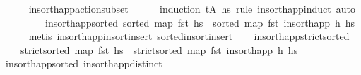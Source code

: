 \begin{isabellebody}
%
\isadelimproof
\ \ \ \ %
\endisadelimproof
%
\isatagproof
{}\isamarkupfalse%
\ insort{\isacharunderscore}{\kern0pt}happ{\isacharunderscore}{\kern0pt}action{\isacharunderscore}{\kern0pt}subset\isanewline
\ \ \ \ \isamarkupfalse%
\ {\isacharparenleft}{\kern0pt}induction\ {\isachardoublequoteopen}{\isacharparenleft}{\kern0pt}tA\ hs\ rule{\isacharcolon}{\kern0pt}\ insort{\isacharunderscore}{\kern0pt}happ{\isachardot}{\kern0pt}induct{\isacharparenright}{\kern0pt}\ auto%
\endisatagproof
{\isafoldproof}%
%
\isadelimproof
\isanewline
%
\endisadelimproof
\ \ \isanewline
\isanewline
\ \ \isanewline
\isanewline
\ \ \isamarkupfalse%
\ insort{\isacharunderscore}{\kern0pt}happ{\isacharunderscore}{\kern0pt}sorted{\isacharcolon}{\kern0pt}\ {\isachardoublequoteopen}sorted\ {\isacharparenleft}{\kern0pt}map\ fst\ hs{\isacharparenright}{\kern0pt}\ {\isasymLongrightarrow}\ sorted\ {\isacharparenleft}{\kern0pt}map\ fst\ {\isacharparenleft}{\kern0pt}insort{\isacharunderscore}{\kern0pt}happ\ h\ hs{\isacharparenright}{\kern0pt}{\isacharparenright}{\kern0pt}{\isachardoublequoteclose}\isanewline
%
\isadelimproof
\ \ \ \ %
\endisadelimproof
%
\isatagproof
{}\isamarkupfalse%
\ {\isacharparenleft}{\kern0pt}metis\ insort{\isacharunderscore}{\kern0pt}happ{\isacharunderscore}{\kern0pt}insort{\isacharunderscore}{\kern0pt}insert\ sorted{\isacharunderscore}{\kern0pt}insort{\isacharunderscore}{\kern0pt}insert{\isacharparenright}{\kern0pt}%
\endisatagproof
{\isafoldproof}%
%
\isadelimproof
\isanewline
%
\endisadelimproof
\isanewline
\ \ \isamarkupfalse%
\ insort{\isacharunderscore}{\kern0pt}happ{\isacharunderscore}{\kern0pt}strict{\isacharunderscore}{\kern0pt}sorted{\isacharcolon}{\kern0pt}\ \isanewline
\ \ \ \ {\isachardoublequoteopen}strict{\isacharunderscore}{\kern0pt}sorted\ {\isacharparenleft}{\kern0pt}map\ fst\ hs{\isacharparenright}{\kern0pt}\ {\isasymLongrightarrow}\ strict{\isacharunderscore}{\kern0pt}sorted\ {\isacharparenleft}{\kern0pt}map\ fst\ {\isacharparenleft}{\kern0pt}insort{\isacharunderscore}{\kern0pt}happ\ h\ hs{\isacharparenright}{\kern0pt}{\isacharparenright}{\kern0pt}{\isachardoublequoteclose}\isanewline
%
\isadelimproof
\ \ \ \ %
\endisadelimproof
%
\isatagproof
{}\isamarkupfalse%
\ insort{\isacharunderscore}{\kern0pt}happ{\isacharunderscore}{\kern0pt}sorted\ insort{\isacharunderscore}{\kern0pt}happ{\isacharunderscore}{\kern0pt}distinct\isanewline

\end{isabellebody}
